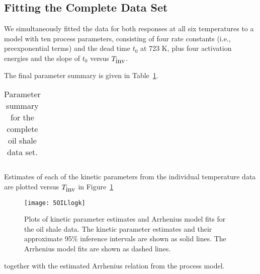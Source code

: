 \subsection{Fitting the Complete Data Set}

We simultaneously fitted
the data for both responses at all six temperatures to a model with ten
process parameters, consisting of
four rate constants (i.e., preexponential terms)
and the dead time $t_{0}$ at 723 K, plus
four activation energies and the slope of $t_{0}$ versus $T_{\mbox{\rm inv}}$.

The final parameter summary is given in
Table~\ref{tbl:process}.
\begin{table}
  \caption{\label{tbl:process}
  Parameter summary for the complete oil shale data set.
  }
  \begin{tabular}{l r r r r r}
  \end{tabular}
\end{table}
Estimates of each of the kinetic parameters from the individual
temperature data are plotted versus $T_{\mbox{\rm inv}}$ in
Figure~\ref{fig:OILlogk}
\begin{figure}
  \centerline{\texttt{[image: 5OILlogk]}}%
  \caption{\label{fig:OILlogk}
  Plots of kinetic parameter estimates and Arrhenius model fits for
  the oil shale data.  The kinetic parameter estimates and their
  approximate 95\% inference intervals are shown as solid lines.  The
  Arrhenius model fits are shown as dashed lines.
  }
\end{figure}
together with the estimated Arrhenius relation from the process model.
